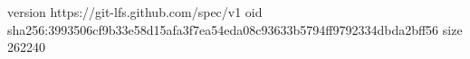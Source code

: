 version https://git-lfs.github.com/spec/v1
oid sha256:3993506cf9b33e58d15afa3f7ea54eda08c93633b5794ff9792334dbda2bff56
size 262240
